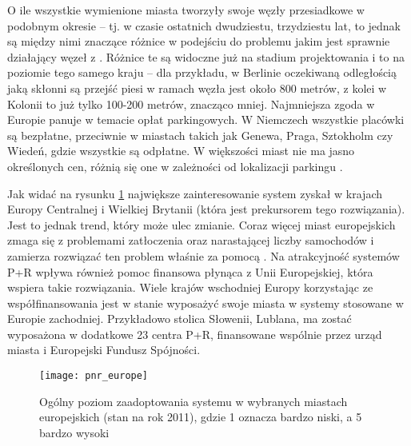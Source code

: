 \documentclass[twoside,12pt]{article}
\begin{document}
	O ile wszystkie wymienione miasta tworzyły swoje węzły przesiadkowe w podobnym okresie -- tj. w czasie ostatnich dwudziestu, trzydziestu lat, to jednak są między nimi znaczące różnice w podejściu do problemu jakim jest sprawnie działający węzeł z \pnr{}. Różnice te są widoczne już na stadium projektowania i to na poziomie tego samego kraju -- dla przykładu, w Berlinie oczekiwaną odległością jaką skłonni są przejść piesi w ramach węzła jest około 800 metrów, z kolei w Kolonii to już tylko 100-200 metrów, znacząco mniej. Najmniejsza zgoda w Europie panuje w temacie opłat parkingowych. W Niemczech wszystkie placówki \pnr{} są bezpłatne, przeciwnie w miastach takich jak Genewa, Praga, Sztokholm czy Wiedeń, gdzie wszystkie są odpłatne. W większości miast nie ma jasno określonych cen, różnią się one w zależności od lokalizacji parkingu \cite{eurotest}.
	
	Jak widać na rysunku \ref{pnr_europe} największe zainteresowanie system \pnr{} zyskał w krajach Europy Centralnej i Wielkiej Brytanii (która jest prekursorem tego rozwiązania). Jest to jednak trend, który może ulec zmianie. Coraz więcej miast europejskich zmaga się z problemami zatłoczenia oraz narastającej liczby samochodów i zamierza rozwiązać ten problem właśnie za pomocą \pnr{}. Na atrakcyjność systemów P+R wpływa również pomoc finansowa płynąca z Unii Europejskiej, która wspiera takie rozwiązania. Wiele krajów wschodniej Europy korzystając ze współfinansowania jest w stanie wyposażyć swoje miasta w systemy stosowane w Europie zachodniej. Przykładowo stolica Słowenii, Lublana, ma zostać wyposażona w dodatkowe 23 centra P+R, finansowane wspólnie przez urząd miasta i Europejski Fundusz Spójności. 
	
	\begin{figure}[H]
		\centering
		\texttt{[image: pnr\_europe]}\\
		\caption{Ogólny poziom zaadoptowania systemu \pnr{} w wybranych miastach europejskich (stan na rok 2011), gdzie 1 oznacza bardzo niski, a 5 bardzo wysoki}
		\label{pnr_europe}
	\end{figure}
	
\end{document}
